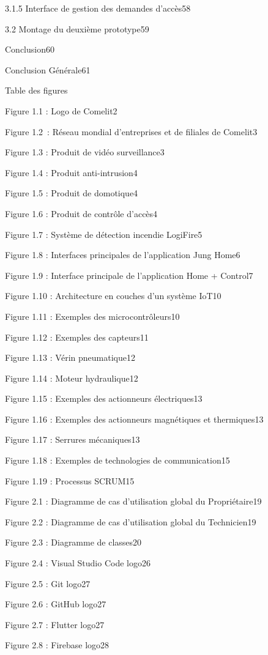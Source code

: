 \documentclass{article}
\begin{document}
3.1.5 Interface de gestion des demandes d’accès58

3.2 Montage du deuxième prototype59

Conclusion60

Conclusion Générale61

Table des figures

Figure 1.1 : Logo de Comelit2

Figure 1.2 : Réseau mondial d’entreprises et de filiales de Comelit3

Figure 1.3 : Produit de vidéo surveillance3

Figure 1.4 : Produit anti-intrusion4

Figure 1.5 : Produit de domotique4

Figure 1.6 : Produit de contrôle d’accès4

Figure 1.7 : Système de détection incendie LogiFire5

Figure 1.8 : Interfaces principales de l’application Jung Home6

Figure 1.9 : Interface principale de l’application Home + Control7

Figure 1.10 : Architecture en couches d’un système IoT10

Figure 1.11 : Exemples des microcontrôleurs10

Figure 1.12 : Exemples des capteurs11

Figure 1.13 : Vérin pneumatique12

Figure 1.14 : Moteur hydraulique12

Figure 1.15 : Exemples des actionneurs électriques13

Figure 1.16 : Exemples des actionneurs magnétiques et thermiques13

Figure 1.17 : Serrures mécaniques13

Figure 1.18 : Exemples de technologies de communication15

Figure 1.19 : Processus SCRUM15

Figure 2.1 : Diagramme de cas d’utilisation global du Propriétaire19

Figure 2.2 : Diagramme de cas d’utilisation global du Technicien19

Figure 2.3 : Diagramme de classes20

Figure 2.4 : Visual Studio Code logo26

Figure 2.5 : Git logo27

Figure 2.6 : GitHub logo27

Figure 2.7 : Flutter logo27

Figure 2.8 : Firebase logo28
\end{document}
